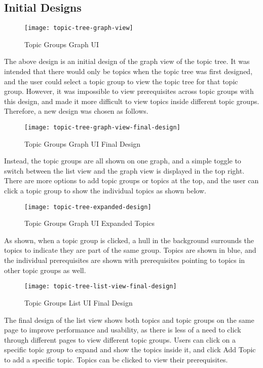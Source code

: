 \subsection{Initial Designs}
\begin{figure}[h!]
    \centering
    \texttt{[image: topic-tree-graph-view]}
    \caption{Topic Groups Graph UI}
\end{figure}

The above design is an initial design of the graph view of the topic tree. It was intended that there would only be topics when the topic tree was first designed, and the user could select a topic group to view the topic tree for that topic group. However, it was impossible to view prerequisites across topic groups with this design, and made it more difficult to view topics inside different topic groups. Therefore, a new design was chosen as follows.

\begin{figure}[h!]
    \centering
    \texttt{[image: topic-tree-graph-view-final-design]}
    \caption{Topic Groups Graph UI Final Design}
\end{figure}

Instead, the topic groups are all shown on one graph, and a simple toggle to switch between the list view and the graph view is displayed in the top right. There are more options to add topic groups or topics at the top, and the user can click a topic group to show the individual topics as shown below.


\begin{figure}[h!]
    \centering
    \texttt{[image: topic-tree-expanded-design]}
    \caption{Topic Groups Graph UI Expanded Topics}
\end{figure}

As shown, when a topic group is clicked, a hull in the background surrounds the topics to indicate they are part of the same group. Topics are shown in blue, and the individual prerequisites are shown with prerequisites pointing to topics in other topic groups as well. 

\begin{figure}[h!]
    \centering
    \texttt{[image: topic-tree-list-view-final-design]}
    \caption{Topic Groups List UI Final Design}
\end{figure}

The final design of the list view shows both topics and topic groups on the same page to improve performance and usability, as there is less of a need to click through different pages to view different topic groups. Users can click on a specific topic group to expand and show the topics inside it, and click Add Topic to add a specific topic. Topics can be clicked to view their prerequisites.

